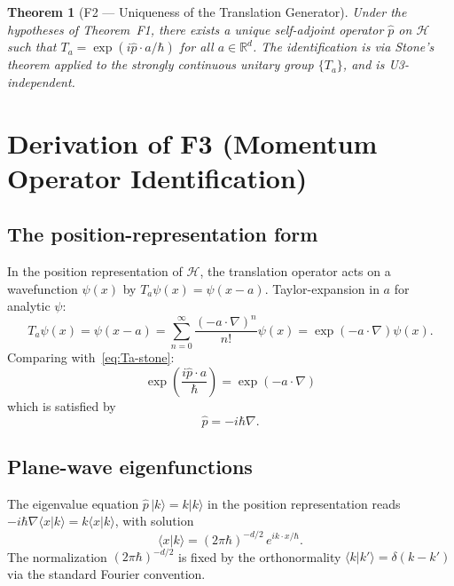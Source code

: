 \documentclass[11pt,a4paper]{article}
\newtheorem{theorem}{Theorem}[section]
\begin{document}
\begin{theorem}[F2 --- Uniqueness of the Translation Generator]
Under the hypotheses of Theorem~F1, there exists a unique self-adjoint operator $\hat{p}$ on $\mathcal{H}$ such that $T_a = \exp(i\hat{p} \cdot a / \hbar)$ for all $a \in \mathbb{R}^d$. The identification is via Stone's theorem applied to the strongly continuous unitary group $\{T_a\}$, and is U3-independent.
\end{theorem}

\section{Derivation of F3 (Momentum Operator Identification)}\label{sec:F3}

\subsection{The position-representation form}

In the position representation of $\mathcal{H}$, the translation operator acts on a wavefunction $\psi(x)$ by $T_a \psi(x) = \psi(x - a)$. Taylor-expansion in $a$ for analytic $\psi$:
\begin{equation}
T_a \psi(x) = \psi(x - a) = \sum_{n=0}^{\infty} \frac{(-a \cdot \nabla)^n}{n!} \psi(x) = \exp(-a \cdot \nabla) \psi(x). \label{eq:Ta-taylor}
\end{equation}
Comparing with~\eqref{eq:Ta-stone}:
\[
\exp\!\left(\frac{i \hat{p} \cdot a}{\hbar}\right) = \exp(-a \cdot \nabla)
\]
which is satisfied by
\begin{equation}
\boxed{\hat{p} = -i\hbar\nabla.} \label{eq:p-position}
\end{equation}

\subsection{Plane-wave eigenfunctions}

The eigenvalue equation $\hat{p} \, |k\rangle = k |k\rangle$ in the position representation reads $-i\hbar\nabla \langle x | k \rangle = k \langle x | k \rangle$, with solution
\begin{equation}
\langle x | k \rangle = (2\pi\hbar)^{-d/2} \, e^{i k \cdot x / \hbar}. \label{eq:planewave}
\end{equation}
The normalization $(2\pi\hbar)^{-d/2}$ is fixed by the orthonormality $\langle k | k' \rangle = \delta(k - k')$ via the standard Fourier convention.
\end{document}
